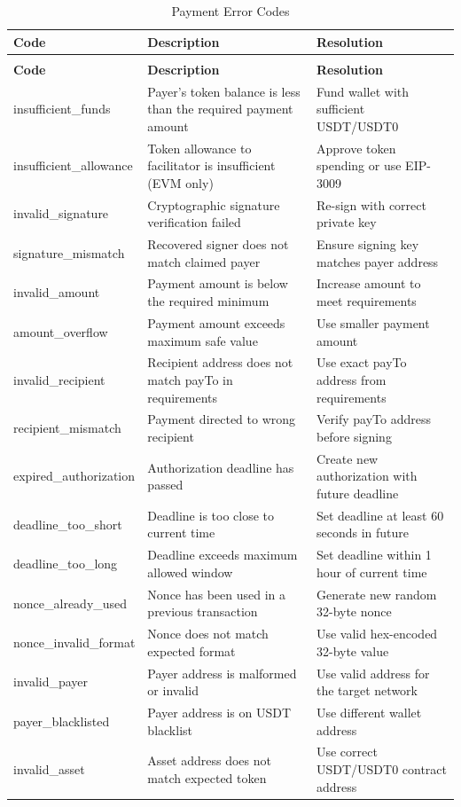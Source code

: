 \begin{longtable}{>{\ttfamily\footnotesize}l p{5cm} p{4cm}}
\caption{Payment Error Codes} \label{tab:payment-errors} \\
\toprule
\normalfont\textbf{Code} & \textbf{Description} & \textbf{Resolution} \\
\midrule
\endfirsthead
\multicolumn{3}{c}{\tablename\ \thetable\ -- continued} \\
\toprule
\normalfont\textbf{Code} & \textbf{Description} & \textbf{Resolution} \\
\midrule
\endhead
\midrule
\endfoot
\bottomrule
\endlastfoot
insufficient\_funds & Payer's token balance is less than the required payment amount & Fund wallet with sufficient USDT/USDT0 \\
insufficient\_allowance & Token allowance to facilitator is insufficient (EVM only) & Approve token spending or use EIP-3009 \\
invalid\_signature & Cryptographic signature verification failed & Re-sign with correct private key \\
signature\_mismatch & Recovered signer does not match claimed payer & Ensure signing key matches payer address \\
invalid\_amount & Payment amount is below the required minimum & Increase amount to meet requirements \\
amount\_overflow & Payment amount exceeds maximum safe value & Use smaller payment amount \\
invalid\_recipient & Recipient address does not match payTo in requirements & Use exact payTo address from requirements \\
recipient\_mismatch & Payment directed to wrong recipient & Verify payTo address before signing \\
expired\_authorization & Authorization deadline has passed & Create new authorization with future deadline \\
deadline\_too\_short & Deadline is too close to current time & Set deadline at least 60 seconds in future \\
deadline\_too\_long & Deadline exceeds maximum allowed window & Set deadline within 1 hour of current time \\
nonce\_already\_used & Nonce has been used in a previous transaction & Generate new random 32-byte nonce \\
nonce\_invalid\_format & Nonce does not match expected format & Use valid hex-encoded 32-byte value \\
invalid\_payer & Payer address is malformed or invalid & Use valid address for the target network \\
payer\_blacklisted & Payer address is on USDT blacklist & Use different wallet address \\
invalid\_asset & Asset address does not match expected token & Use correct USDT/USDT0 contract address \\
\end{longtable}

